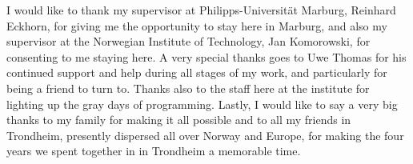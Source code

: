 I would like to thank my supervisor at Philipps-Universit{\"a}t Marburg,
Reinhard Eckhorn, for giving me the opportunity to stay here in
Marburg, and also my supervisor at the Norwegian Institute of
Technology, Jan Komorowski, for consenting to me staying here.  A very
special thanks goes to Uwe Thomas for his continued support and help
during all stages of my work, and particularly for being a friend to
turn to.  Thanks also to the staff here at the institute for lighting
up the gray days of programming.  Lastly, I would like to say a very
big thanks to my family for making it all possible and to all my
friends in Trondheim, presently dispersed all over Norway and Europe,
for making the four years we spent together in in Trondheim a
memorable time.
